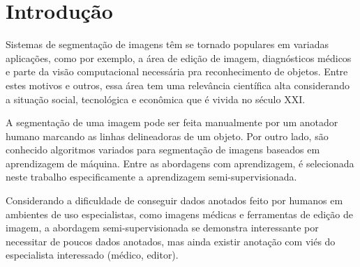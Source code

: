 \chapter{Introdução}\label{cap:introducao}

Sistemas de segmentação de imagens têm se tornado populares em
variadas aplicações, como por exemplo, a área de edição de imagem,
diagnósticos médicos e parte da visão computacional necessária pra
reconhecimento de objetos. Entre estes motivos e outros, essa área tem
uma relevância científica alta considerando a situação social,
tecnológica e econômica que é vivida no século XXI.\@

\begin{figure}[h!]
        \captionsetup{width=16cm}
		\centering
\end{figure}


A segmentação de uma imagem pode ser feita manualmente por um anotador
humano marcando as linhas delineadoras de um objeto. Por outro lado,
são conhecido algoritmos variados para segmentação de imagens baseados
em aprendizagem de máquina. Entre as abordagens com aprendizagem, é
selecionada neste trabalho especificamente a aprendizagem
semi-supervisionada.


Considerando a dificuldade de conseguir dados anotados feito por
humanos em ambientes de uso especialistas, como imagens médicas e
ferramentas de edição de imagem, a abordagem semi-supervisionada se
demonstra interessante por necessitar de poucos dados anotados, mas ainda
existir anotação com viés do especialista interessado (médico,
editor).

